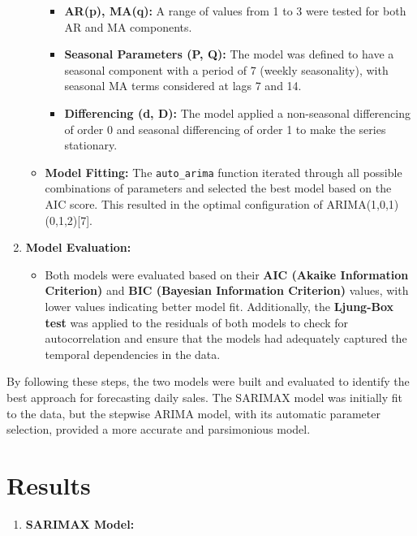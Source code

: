 \documentclass[
  a4paper,
  DIV=11,
  numbers=noendperiod]{scrartcl}
\providecommand{\tightlist}{%
  \setlength{\itemsep}{0pt}\setlength{\parskip}{0pt}}\usepackage{longtable,booktabs,array}
\begin{document}
\begin{enumerate}
\begin{itemize}
    \begin{itemize}
    \tightlist
    \item
      \textbf{AR(p), MA(q):} A range of values from 1 to 3 were tested
      for both AR and MA components.
    \item
      \textbf{Seasonal Parameters (P, Q):} The model was defined to have
      a seasonal component with a period of 7 (weekly seasonality), with
      seasonal MA terms considered at lags 7 and 14.
    \item
      \textbf{Differencing (d, D):} The model applied a non-seasonal
      differencing of order 0 and seasonal differencing of order 1 to
      make the series stationary.
    \end{itemize}
  \item
    \textbf{Model Fitting:} The \texttt{auto\_arima} function iterated
    through all possible combinations of parameters and selected the
    best model based on the AIC score. This resulted in the optimal
    configuration of ARIMA(1,0,1)(0,1,2){[}7{]}.
  \end{itemize}
\item
  \textbf{Model Evaluation:}

  \begin{itemize}
  \tightlist
  \item
    Both models were evaluated based on their \textbf{AIC (Akaike
    Information Criterion)} and \textbf{BIC (Bayesian Information
    Criterion)} values, with lower values indicating better model fit.
    Additionally, the \textbf{Ljung-Box test} was applied to the
    residuals of both models to check for autocorrelation and ensure
    that the models had adequately captured the temporal dependencies in
    the data.
  \end{itemize}
\end{enumerate}

By following these steps, the two models were built and evaluated to
identify the best approach for forecasting daily sales. The SARIMAX
model was initially fit to the data, but the stepwise ARIMA model, with
its automatic parameter selection, provided a more accurate and
parsimonious model.

\section{Results}\label{results}

\begin{enumerate}
\def\labelenumi{\arabic{enumi}.}
\tightlist
\item
  \textbf{SARIMAX Model:}
\end{enumerate}
\end{document}
